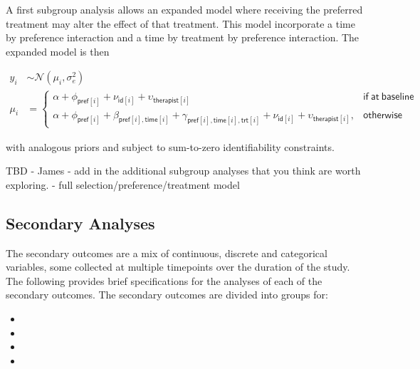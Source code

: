 \documentclass[
]{article}
\begin{document}
A first subgroup analysis allows an expanded model where receiving the preferred treatment may alter the effect of that treatment.
This model incorporate a time by preference interaction and a time by treatment by preference interaction.
The expanded model is then

\[
  \begin{aligned}
    y_{i} & \sim \mathcal{N}(\mu_{i}, \sigma_e^2) \\
    \mu_i & = \begin{cases}
      \alpha + \phi_{\mathsf{pref}[i]} + \nu_{\mathsf{id}[i]} + \upsilon_{\mathsf{therapist}[i]}                                                                                                             & \mathsf{if \ at \ baseline} \\
      \alpha + \phi_{\mathsf{pref}[i]} + \beta_{\mathsf{pref}[i], \mathsf{time}[i]} + \gamma_{\mathsf{pref}[i], \mathsf{time}[i],\mathsf{trt}[i]} + \nu_{\mathsf{id}[i]} + \upsilon_{\mathsf{therapist}[i]}, & \mathsf{otherwise}
    \end{cases}
  \end{aligned}
\]

with analogous priors and subject to sum-to-zero identifiability constraints.

TBD - James - add in the additional subgroup analyses that you think are worth exploring.
- full selection/preference/treatment model

\hypertarget{secondary-analyses}{%
  \subsection{Secondary Analyses}\label{secondary-analyses}}

The secondary outcomes are a mix of continuous, discrete and categorical variables, some collected at multiple timepoints over the duration of the study.
The following provides brief specifications for the analyses of each of the secondary outcomes.
The secondary outcomes are divided into groups for:

\begin{itemize}
  \item {}
  \item {}
  \item {}
  \item {}
\end{itemize}
\end{document}

